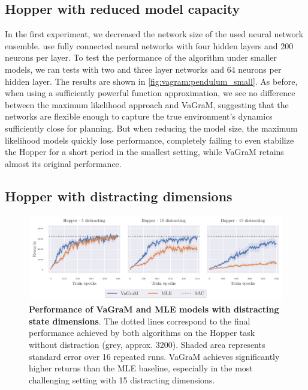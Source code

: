 \subsection{Hopper with reduced model capacity}
In the first experiment, we decreased the network size of the used neural network ensemble.
\cite{mbpo} use fully connected neural networks with four hidden layers and 200 neurons per layer.
To test the performance of the algorithm under smaller models, we ran tests with two and three layer networks and 64 neurons per hidden layer.
The results are shown in \autoref{fig:vagram:pendulum_small}.
As before, when using a sufficiently powerful function approximation, we see no difference between the maximum likelihood approach and VaGraM, suggesting that the networks are flexible enough to capture the true environment's dynamics sufficiently close for planning.
But when reducing the model size, the maximum likelihood models quickly lose performance, completely failing to even stabilize the Hopper for a short period in the smallest setting, while VaGraM retains almost its original performance.

\subsection{Hopper with distracting dimensions}


\begin{figure}[t]
    \includegraphics[clip, trim=0.2cm 0.0cm 0.4cm 0.0cm, width=1.\linewidth]{figures/vagram/fig_1.pdf}
    \caption{\textbf{Performance of VaGraM and MLE models with distracting state dimensions}. The dotted lines correspond to the final performance achieved by both algorithms on the Hopper task without distraction (grey, approx. 3200). Shaded area represents standard error over 16 repeated runs. VaGraM achieves significantly higher returns than the MLE baseline, especially in the most challenging setting with 15 distracting dimensions.}
    \label{fig:vagram:pendulum_distraction}
\end{figure}

